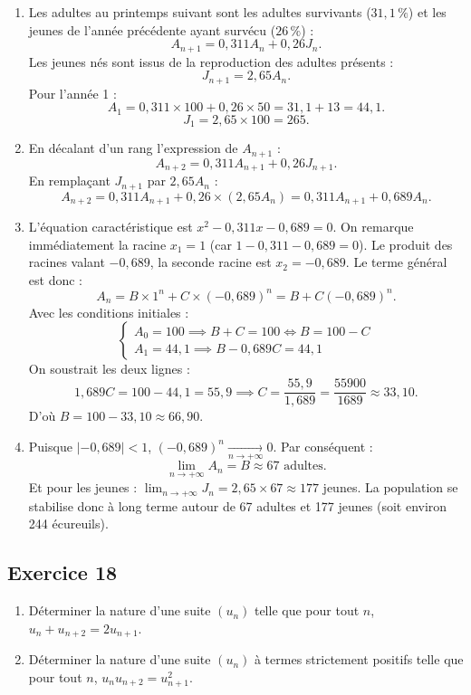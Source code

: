 \documentclass[11pt,a4paper]{article}
\begin{document}
\begin{correctionbox}
\begin{enumerate}
    \item Les adultes au printemps suivant sont les adultes survivants ($31{,}1\,\%$) et les jeunes de l'année précédente ayant survécu ($26\,\%$) :
    \[
    A_{n+1} = 0{,}311 A_n + 0{,}26 J_n.
    \]
    Les jeunes nés sont issus de la reproduction des adultes présents :
    \[
    J_{n+1} = 2{,}65 A_n.
    \]
    Pour l'année 1 :
    \[
    A_1 = 0{,}311 \times 100 + 0{,}26 \times 50 = 31{,}1 + 13 = 44{,}1.
    \]
    \[
    J_1 = 2{,}65 \times 100 = 265.
    \]
    \item En décalant d'un rang l'expression de $A_{n+1}$ :
    \[
    A_{n+2} = 0{,}311 A_{n+1} + 0{,}26 J_{n+1}.
    \]
    En remplaçant $J_{n+1}$ par $2{,}65 A_n$ :
    \[
    A_{n+2} = 0{,}311 A_{n+1} + 0{,}26 \times (2{,}65 A_n) = 0{,}311 A_{n+1} + 0{,}689 A_n.
    \]
    \item L'équation caractéristique est $x^2 - 0{,}311 x - 0{,}689 = 0$.
    On remarque immédiatement la racine $x_1 = 1$ (car $1 - 0{,}311 - 0{,}689 = 0$).
    Le produit des racines valant $-0{,}689$, la seconde racine est $x_2 = -0{,}689$.
    Le terme général est donc :
    \[
    A_n = B \times 1^n + C \times (-0{,}689)^n = B + C(-0{,}689)^n.
    \]
    Avec les conditions initiales :
    \[
    \begin{cases}
    A_0 = 100 \implies B + C = 100 \iff B = 100 - C\\
    A_1 = 44{,}1 \implies B - 0{,}689 C = 44{,}1
    \end{cases}
    \]
    On soustrait les deux lignes :
    \[
    1{,}689 C = 100 - 44{,}1 = 55{,}9 \implies C = \frac{55{,}9}{1{,}689} = \frac{55900}{1689} \approx 33{,}10.
    \]
    D'où $B = 100 - 33{,}10 \approx 66{,}90$.
    \item Puisque $|-0{,}689| < 1$, $(-0{,}689)^n \xrightarrow[n \to +\infty]{} 0$.
    Par conséquent :
    \[
    \lim_{n \to +\infty} A_n = B \approx 67 \text{ adultes}.
    \]
    Et pour les jeunes : $\lim_{n \to +\infty} J_n = 2{,}65 \times 67 \approx 177$ jeunes.
    La population se stabilise donc à long terme autour de 67 adultes et 177 jeunes (soit environ 244 écureuils).
\end{enumerate}
\end{correctionbox}

\subsection*{Exercice 18}
\begin{enumerate}
    \item Déterminer la nature d'une suite $(u_n)$ telle que pour tout $n$, $u_n + u_{n+2} = 2u_{n+1}$.
    \item Déterminer la nature d'une suite $(u_n)$ à termes strictement positifs telle que pour tout $n$, $u_n u_{n+2} = u_{n+1}^2$.
\end{enumerate}
\end{document}
